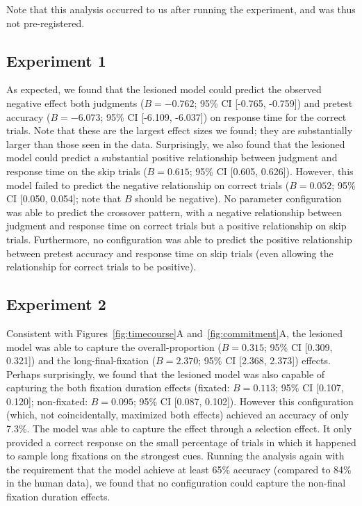 Note that this analysis occurred to us after running the experiment, and was thus not pre-registered.

\subsection{Experiment 1}

As expected, we found that the lesioned model could predict the observed negative effect both judgments ($B = -0.762$; 95\% CI [-0.765, -0.759]) and pretest accuracy ($B = -6.073$; 95\% CI [-6.109, -6.037]) on response time for the correct trials. Note that these are the largest effect sizes we found; they are substantially larger than those seen in the data. Surprisingly, we also found that the lesioned model could predict a substantial positive relationship between judgment and response time on the skip trials ($B = 0.615$; 95\% CI [0.605, 0.626]). However, this model failed to predict the negative relationship on correct trials ($B = 0.052$; 95\% CI [0.050, 0.054]; note that $B$ should be negative). No parameter configuration was able to predict the crossover pattern, with a negative relationship between judgment and response time on correct trials but a positive relationship on skip trials. Furthermore, no configuration was able to predict the positive relationship between pretest accuracy and response time on skip trials (even allowing the relationship for correct trials to be positive).

\subsection{Experiment 2}

Consistent with Figures~\ref{fig:timecourse}A and~\ref{fig:commitment}A, the lesioned model was able to capture the overall-proportion ($B = 0.315$; 95\% CI [0.309, 0.321]) and the long-final-fixation ($B = 2.370$; 95\% CI [2.368, 2.373]) effects. Perhaps surprisingly, we found that the lesioned model was also capable of capturing the both fixation duration effects (fixated: $B = 0.113$; 95\% CI [0.107, 0.120]; non-fixated: $B = 0.095$; 95\% CI [0.087, 0.102]). However this configuration (which, not coincidentally, maximized both effects) achieved an accuracy of only 7.3\%. The model was able to capture the effect through a selection effect. It only provided a correct response on the small percentage of trials in which it happened to sample long fixations on the strongest cues. Running the analysis again with the requirement that the model achieve at least 65\% accuracy (compared to 84\% in the human data), we found that no configuration could capture the non-final fixation duration effects.


